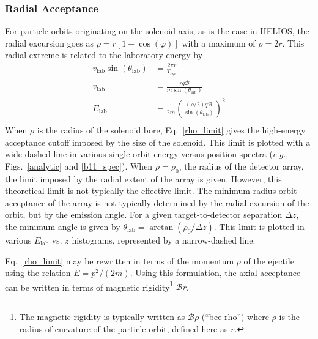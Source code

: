 \subsubsection{Radial Acceptance}
For particle orbits originating on the solenoid axis, as is the case in HELIOS, the radial excursion goes as $\rho=r[1-\cos(\varphi)]$ with a maximum of $\rho=2r$.  This radial extreme is related to the laboratory energy by
\begin{equation}
\begin{split}
v_\mathrm{lab}\sin(\theta_\mathrm{lab})&=\frac{2\pi r}{T_\mathrm{cyc}}\\
v_\mathrm{lab}&=\frac{rq\mathscr{B}}{m\sin(\theta_\mathrm{lab})}\\
E_\mathrm{lab}&=\frac{1}{2m}\left(\frac{(\rho/2)q\mathscr{B}}{\sin(\theta_\mathrm{lab})}\right)^2\\
\end{split}
\label{rho_limit}
\end{equation}
When $\rho$ is the radius of the solenoid bore, Eq.~\ref{rho_limit} gives the high-energy acceptance cutoff imposed by the size of the solenoid.  This limit is plotted with a wide-dashed line in various single-orbit energy versus position spectra (\textit{e.g.}, Figs.~\ref{analytic} and \ref{b11_spec}).  When $\rho=\rho_0$, the radius of the detector array, the limit imposed by the radial extent of the array is given.  However, this theoretical limit is not typically the effective limit.  The minimum-radius orbit acceptance of the array is not typically determined by the radial excursion of the orbit, but by the emission angle.  For a given target-to-detector separation $\Delta z$, the minimum angle is given by $\theta_\mathrm{lab}=\arctan(\rho_0/\Delta z)$.  This limit is plotted in various $E_\mathrm{lab}$ vs. $z$ histograms, represented by a narrow-dashed line.

Eq.~\ref{rho_limit} may be rewritten in terms of the momentum $p$ of the ejectile using the relation $E=p^2/(2m)$.  Using this formulation, the axial acceptance can be written in terms of magnetic rigidity\footnote{The magnetic rigidity is typically written as $\mathscr{B}\rho$ (``bee-rho'') where $\rho$ is the radius of curvature of the particle orbit, defined here as $r$.} $\mathscr{B}r$. 

